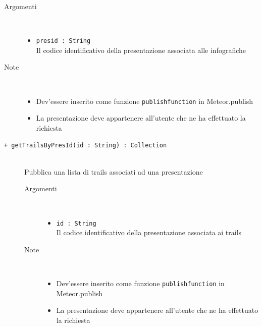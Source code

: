 \begin{description}
\begin{description}
		\begin{description}
			\item[Argomenti] \hfill \\
				\begin{itemize}
				
					\item \texttt{presid : String			} \hfill \\
					Il codice identificativo della presentazione associata alle infografiche
					
				\end{itemize}
			\item[Note] \hfill \\
			\begin{itemize}
					\item Dev'essere inserito come funzione \texttt{publishfunction} in Meteor.publish
					\item La presentazione deve appartenere all'utente che ne ha effettuato la richiesta
				\end{itemize}
		\end{description}
	\end{description}
	
	\begin{description}
		\item[\texttt{+ getTrailsByPresId(id : String) : Collection			}] \hfill \\
			Pubblica una lista di trails associati ad una presentazione
			
		\begin{description}
			\item[Argomenti] \hfill \\
				\begin{itemize}
				
					\item \texttt{id : String			} \hfill \\
					Il codice identificativo della presentazione associata ai trails
					
				\end{itemize}
			\item[Note] \hfill \\
			\begin{itemize}
					\item Dev'essere inserito come funzione \texttt{publishfunction} in Meteor.publish
					\item La presentazione deve appartenere all'utente che ne ha effettuato la richiesta
				\end{itemize}
		\end{description}
	\end{description}
	

\end{description}
